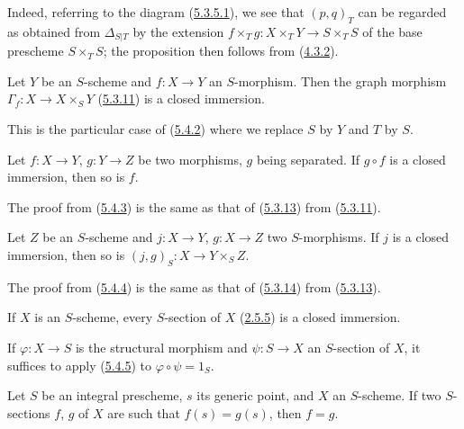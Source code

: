 Indeed, referring to the diagram
(\hyperref[I.5.3.5.1]{5.3.5.1}), we see that $(p,q)_T$ can be regarded
as obtained from $\Delta_{S|T}$ by the extension
$f\times_T g:X\times_T Y\to S\times_T S$ of the base prescheme $S\times_T S$;
the proposition then follows from (\hyperref[I.4.3.2]{4.3.2}).

\begin{corollary}[5.4.3]
\label{I.5.4.3}
Let $Y$ be an $S$-scheme and $f:X\to Y$ an $S$-morphism. Then the graph
morphism $\Gamma_f:X\to X\times_S Y$ \textup{(\hyperref[I.5.3.11]{5.3.11})} is a
closed immersion.
\end{corollary}

This is the particular case of (\hyperref[I.5.4.2]{5.4.2}) where we replace
$S$ by $Y$ and $T$ by $S$.

\begin{corollary}[5.4.4]
\label{I.5.4.4}
Let $f:X\to Y$, $g:Y\to Z$ be two morphisms, $g$ being separated. If
$g\circ f$ is a closed immersion, then so is $f$.
\end{corollary}

The proof from (\hyperref[I.5.4.3]{5.4.3}) is the same as
that of (\hyperref[I.5.3.13]{5.3.13}) from
(\hyperref[I.5.3.11]{5.3.11}).

\begin{corollary}[5.4.5]
\label{I.5.4.5}
Let $Z$ be an $S$-scheme and $j:X\to Y$, $g:X\to Z$ two $S$-morphisms. If $j$
is a closed immersion, then so is
$(j,g)_S:X\to Y\times_S Z$.
\end{corollary}

The proof from (\hyperref[I.5.4.4]{5.4.4}) is the same as
that of (\hyperref[I.5.3.14]{5.3.14}) from
(\hyperref[I.5.3.13]{5.3.13}).

\begin{corollary}[5.4.6]
\label{I.5.4.6}
If $X$ is an $S$-scheme, every $S$-section of $X$
\textup{(\hyperref[I.2.5.5]{2.5.5})} is a closed immersion.
\end{corollary}

If $\varphi:X\to S$ is the structural morphism and $\psi:S\to X$ an
$S$-section of $X$, it suffices to apply
(\hyperref[I.5.4.5]{5.4.5}) to $\varphi\circ\psi=1_S$.

\begin{corollary}[5.4.7]
\label{I.5.4.7}
Let $S$ be an integral prescheme, $s$ its generic point, and $X$ an
$S$-scheme. If two $S$-sections $f$, $g$ of $X$ are such that $f(s)=g(s)$,
then $f=g$.
\end{corollary}

